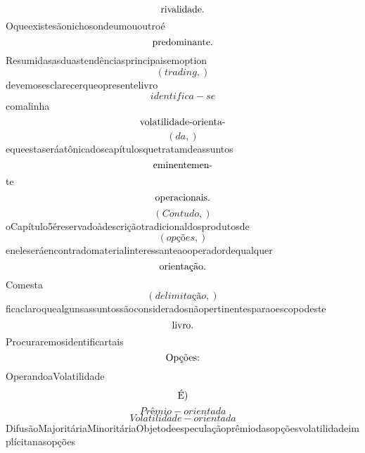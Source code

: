 \documentclass{article}
\begin{document}
\begin{equation}
$rivalidade.$
\end{equation}Oqueexistesãonichosondeumououtroé\begin{equation}
$predominante.$
\end{equation}Resumidasasduastendênciasprincipaisemoption\begin{equation}
\left( trading,\right)
\end{equation}devemosesclarecerqueopresentelivro\begin{equation}
identifica - se
\end{equation}comalinha\begin{equation}
$volatilidade-orienta-$
\end{equation}\begin{equation}
\left( da,\right)
\end{equation}equeestaseráatônicadoscapítulosquetratamdeassuntos\begin{equation}
$eminentemen-$
\end{equation}te\begin{equation}
$operacionais.$
\end{equation}\begin{equation}
\left( Contudo,\right)
\end{equation}oCapítulo5éreservadoàdescriçãotradicionaldosprodutosde\begin{equation}
\left( opções,\right)
\end{equation}eneleseráencontradomaterialinteressanteaooperadordequalquer\begin{equation}
$orientação.$
\end{equation}Comesta\begin{equation}
\left( delimitação,\right)
\end{equation}ficaclaroquealgunsassuntossãoconsideradosnãopertinentesparaoescopodeste\begin{equation}
$livro.$
\end{equation}Procuraremosidentificartais\begin{equation}
$Opções:$
\end{equation}OperandoaVolatilidade\begin{equation}
$É)$
\end{equation}\begin{equation}
Prêmio - orientada
\end{equation}\begin{equation}
Volatilidade - orientada
\end{equation}DifusãoMajoritáriaMinoritáriaObjetodeespeculaçãoprêmiodasopçõesvolatilidadeimplícitanasopções\begin{equation}

\end{equation}
\end{document}
